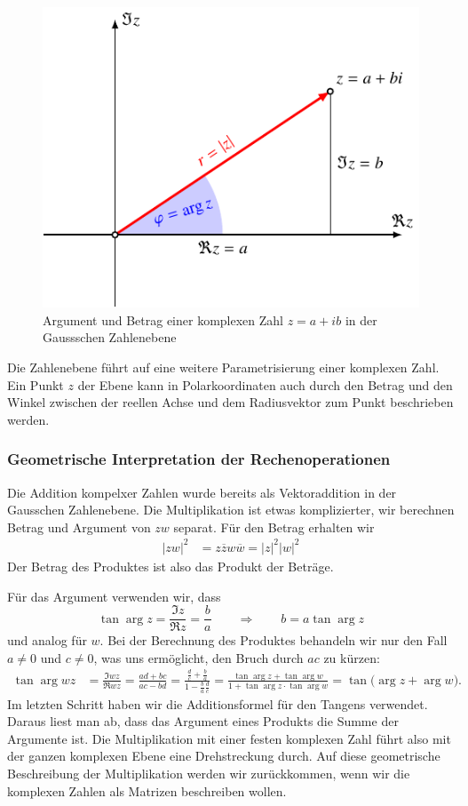 \begin{figure}
\centering
\includegraphics{chapters/05-zahlen/images/komplex.pdf}
\caption{Argument und Betrag einer komplexen Zahl $z=a+ib$ in der 
Gaussschen Zahlenebene
\label{buch:zahlen:cfig}}
\end{figure}
Die Zahlenebene führt auf eine weitere Parametrisierung einer
komplexen Zahl.
Ein Punkt $z$ der Ebene kann in Polarkoordinaten auch durch den Betrag
und den Winkel zwischen der reellen Achse und dem Radiusvektor zum Punkt
beschrieben werden.


\subsubsection{Geometrische Interpretation der Rechenoperationen}
Die Addition kompelxer Zahlen wurde bereits als Vektoraddition
in der Gausschen Zahlenebene. 
Die Multiplikation ist etwas komplizierter, wir berechnen Betrag
und Argument von $zw$ separat.
Für den Betrag erhalten wir
\begin{align*}
|zw|^2
&=
z\overline{z}w\overline{w}
=
|z|^2|w|^2
\end{align*}
Der Betrag des Produktes ist also das Produkt der Beträge.

Für das Argument verwenden wir, dass
\[
\tan\operatorname{arg}z
=
\frac{\Im z}{\Re z}
=
\frac{b}{a}
\qquad\Rightarrow\qquad
b=a\tan\operatorname{arg}z
\]
und analog für $w$.
Bei der Berechnung des Produktes behandeln wir nur den Fall $a\ne 0$ 
und $c\ne 0$, was uns ermöglicht, den Bruch durch $ac$ zu kürzen:
\begin{align*}
\tan\arg wz
&=
\frac{\Im wz}{\Re wz}
=
\frac{ad+bc}{ac-bd}
=
\frac{\frac{d}{c} + \frac{b}{a}}{1-\frac{b}{a}\frac{d}{c}}
=
\frac{
\tan\operatorname{arg}z+\tan\operatorname{arg}w
}{
1+
\tan\operatorname{arg}z\cdot\tan\operatorname{arg}w
}
=
\tan\bigl(
\operatorname{arg}z+\operatorname{arg}w
\bigr).
\end{align*}
Im letzten Schritt haben wir die Additionsformel für den Tangens verwendet.
Daraus liest man ab, dass das Argument eines Produkts die Summe der
Argumente ist.
Die Multiplikation mit einer festen komplexen Zahl führt also mit der ganzen
komplexen Ebene eine Drehstreckung durch.
Auf diese geometrische Beschreibung der Multiplikation werden wir zurückkommen,
wenn wir die komplexen Zahlen als Matrizen beschreiben wollen.

